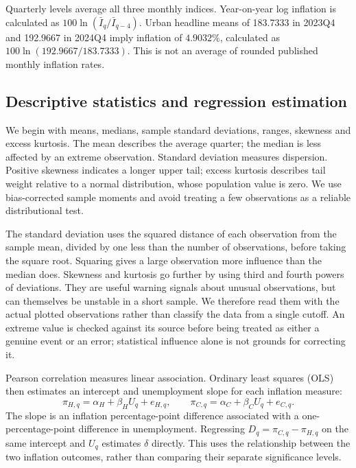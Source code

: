 \documentclass[10pt,a4paper]{article}
\begin{document}
Quarterly levels average all three monthly indices. Year-on-year log inflation is calculated as $100\ln(\bar I_q/\bar I_{q-4})$.
Urban headline means of 183.7333 in 2023Q4 and 192.9667 in 2024Q4 imply inflation of $4.9032\%$, calculated as $100\ln(192.9667/183.7333)$. This is not an average of rounded published monthly inflation rates.

\clearpage
\subsection{Descriptive statistics and regression estimation}

We begin with means, medians, sample standard deviations, ranges, skewness and excess kurtosis. The mean describes the average quarter; the median is less affected by an extreme observation. Standard deviation measures dispersion. Positive skewness indicates a longer upper tail; excess kurtosis describes tail weight relative to a normal distribution, whose population value is zero. We use bias-corrected sample moments and avoid treating a few observations as a reliable distributional test.

The standard deviation uses the squared distance of each observation from the sample mean, divided by one less than the number of observations, before taking the square root. Squaring gives a large observation more influence than the median does. Skewness and kurtosis go further by using third and fourth powers of deviations. They are useful warning signals about unusual observations, but can themselves be unstable in a short sample. We therefore read them with the actual plotted observations rather than classify the data from a single cutoff. An extreme value is checked against its source before being treated as either a genuine event or an error; statistical influence alone is not grounds for correcting it.

Pearson correlation measures linear association. Ordinary least squares (OLS) then estimates an intercept and unemployment slope for each inflation measure:
\begin{equation}
\pi_{H,q}=\alpha_H+\beta_H U_q+e_{H,q},\qquad
\pi_{C,q}=\alpha_C+\beta_C U_q+e_{C,q}.
\label{eq:reg}
\end{equation}
The slope is an inflation percentage-point difference associated with a one-percentage-point difference in unemployment. Regressing $D_q=\pi_{C,q}-\pi_{H,q}$ on the same intercept and $U_q$ estimates $\delta$ directly. This uses the relationship between the two inflation outcomes, rather than comparing their separate significance levels.
\end{document}
